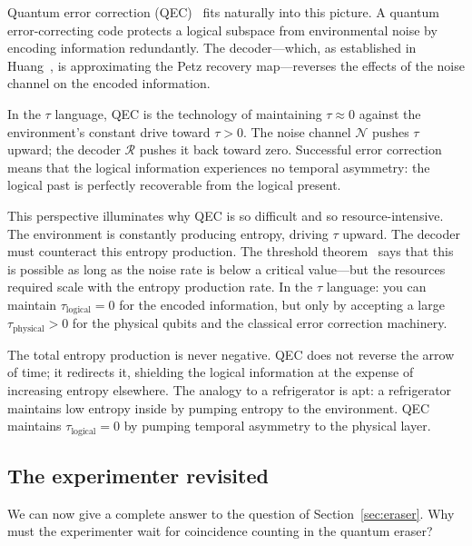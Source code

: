 \documentclass[12pt]{article}
\theoremstyle{definition}
\theoremstyle{remark}
\newcommand{\Petz}{\mathcal{R}}
\newcommand{\chan}{\mathcal{N}}
\newcommand{\tauasym}{\tau}
\begin{document}
Quantum error correction (QEC)~\cite{KnillLaflamme1997} fits
naturally into this picture.  A quantum error-correcting code
protects a logical subspace from environmental noise by
encoding information redundantly.  The decoder---which, as
established in Huang~\cite{Huang2026}, is approximating the
Petz recovery map---reverses the effects of the noise channel
on the encoded information.

In the $\tauasym$ language, QEC is the technology of
maintaining $\tauasym \approx 0$ against the environment's
constant drive toward $\tauasym > 0$.  The noise channel
$\chan$ pushes $\tauasym$ upward; the decoder $\Petz$ pushes
it back toward zero.  Successful error correction means that
the logical information experiences no temporal asymmetry: the
logical past is perfectly recoverable from the logical present.

This perspective illuminates why QEC is so difficult and so
resource-intensive.  The environment is constantly producing
entropy, driving $\tauasym$ upward.  The decoder must
counteract this entropy production.  The threshold
theorem~\cite{Acharya2025} says that this is possible as long
as the noise rate is below a critical value---but the resources
required scale with the entropy production rate.  In the
$\tauasym$ language: you can maintain $\tauasym_{\text{logical}} = 0$
for the encoded information, but only by accepting a large
$\tauasym_{\text{physical}} > 0$ for the physical qubits and the
classical error correction machinery.

The total entropy production is never negative.  QEC does not
reverse the arrow of time; it redirects it, shielding the logical
information at the expense of increasing entropy elsewhere.  The
analogy to a refrigerator is apt: a refrigerator maintains low
entropy inside by pumping entropy to the environment.  QEC
maintains $\tauasym_{\text{logical}} = 0$ by pumping temporal
asymmetry to the physical layer.

\subsection{The experimenter revisited}

We can now give a complete answer to the question of
Section~\ref{sec:eraser}.  Why must the experimenter wait for
coincidence counting in the quantum eraser?
\end{document}
